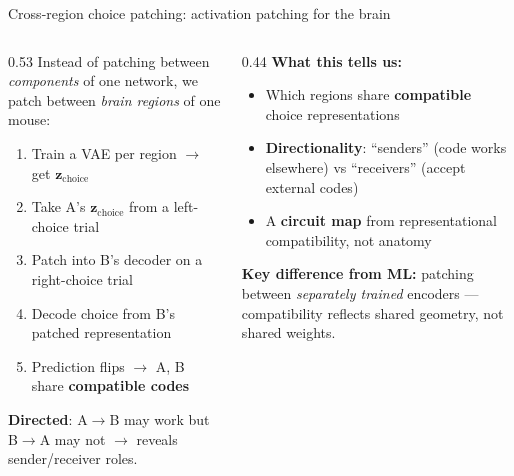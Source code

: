 \documentclass[aspectratio=169,11pt]{beamer}
\begin{document}
\begin{frame}{Cross-region choice patching: activation patching for the brain}

\begin{columns}[T]
\begin{column}{0.53\textwidth}
{\small Instead of patching between \emph{components} of one network, we patch between \emph{brain regions} of one mouse:}

\vspace{0.2em}
{\small
\begin{enumerate}\setlength\itemsep{0.15em}
  \item Train a VAE per region $\to$ get $\mathbf{z}_{\text{choice}}$
  \item Take A's $\mathbf{z}_{\text{choice}}$ from a left-choice trial
  \item Patch into B's decoder on a right-choice trial
  \item Decode choice from B's patched representation
  \item Prediction flips $\to$ A, B share \textbf{compatible codes}
\end{enumerate}
}

\vspace{0.2em}
{\small \textbf{Directed}: A$\to$B may work but B$\to$A may not $\to$ reveals sender/receiver roles.}
\end{column}

\begin{column}{0.44\textwidth}
\textbf{What this tells us:}

\vspace{0.2em}
{\small
\begin{itemize}\setlength\itemsep{0.15em}
  \item Which regions share \textbf{compatible} choice representations
  \item \textbf{Directionality}: ``senders'' (code works elsewhere) vs ``receivers'' (accept external codes)
  \item A \textbf{circuit map} from representational compatibility, not anatomy
\end{itemize}
}

\vspace{0.2em}
{\small \textbf{Key difference from ML:} patching between \emph{separately trained} encoders --- compatibility reflects shared geometry, not shared weights.}
\end{column}
\end{columns}
\end{frame}
\end{document}
